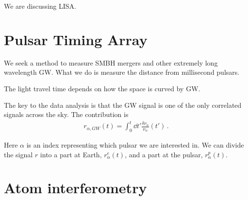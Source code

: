 \documentclass[main.tex]{subfiles}
\begin{document}

We are discussing LISA. 

\section{Pulsar Timing Array}

We seek a method to measure SMBH mergers and other extremely long wavelength GW. 
What we do is measure the distance from millisecond pulsars. 

The light travel time depends on how the space is curved by GW. 

The key to the data analysis is that the GW signal is one of the only correlated signals across the sky. The contribution is 
%
\begin{align}
r_{\alpha , GW} (t) = \int_{0}^{t} \dd{t'} \frac{ \delta \nu _\alpha }{\nu _\alpha } (t')
\,.
\end{align}

Here \(\alpha \) is an index representing which pulsar we are interested in. 
We can divide the signal \(r\) into a part at Earth,  \(r^{e}_{\alpha }(t)\), and a part at the pulsar, \(r^{p}_{\alpha }(t)\). 


\section{Atom interferometry}
\end{document}

